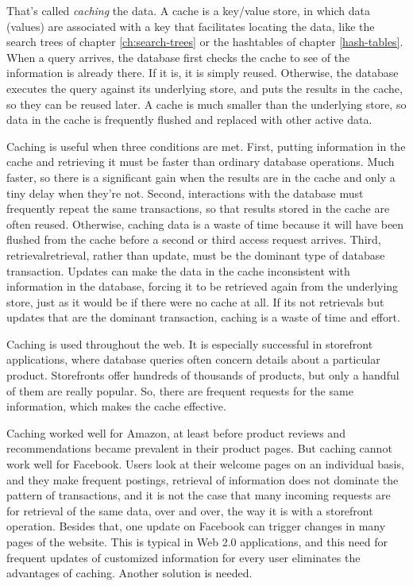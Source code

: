 That's called \emph{caching} the data.
A cache is a key/value store,
in which data (values) are associated with a key
that facilitates locating the data,
like the search trees of chapter \ref{ch:search-trees}
or the hashtables of chapter \ref{hash-tables}.
When a query arrives, the database first checks
the cache to see of the information is already there.
If it is, it is simply reused.
Otherwise, the database executes the query against its underlying store,
and puts the results in the cache, so they can be reused later.
A cache is much smaller than the underlying store,
so data in the cache is frequently flushed and replaced with other active data.

Caching is useful when three conditions are met.
First, putting information in the cache and retrieving it
must be faster than ordinary database operations.
Much faster, so there is a significant gain
when the results are in the cache and only a tiny delay when they're not.
Second, interactions with the database must frequently repeat the same transactions,
so that results stored in the cache are often reused.
Otherwise, caching data is a waste of time because it will
have been flushed from the cache before a second or third access request arrives.
Third, retrievalretrieval,
rather than update, must be the dominant type of database transaction.
Updates can make the data in the cache inconsistent with information in the database,
forcing it to be retrieved again from the underlying store,
just as it would be if there were no cache at all.
If its not retrievals but updates that are the dominant transaction,
caching is a waste of time and effort.

Caching is used throughout the web.
It is especially successful in storefront applications,
where database queries often concern details about a particular product.
Storefronts offer hundreds of thousands of products,
but only a handful of them are really popular.
So, there are frequent requests for the same information,
which makes the cache effective.

Caching worked well for Amazon, at least before product reviews
and recommendations became prevalent in their product pages.
But caching cannot work well for Facebook.
Users look at their welcome pages on an individual basis,
and they make frequent postings, retrieval of information
does not dominate the pattern of transactions,
and it is not the case that many incoming requests
are for retrieval of the same data, over and over,
the way it is with a storefront operation.
Besides that, one update on Facebook can trigger changes in many pages of the website.
This is typical in Web 2.0 applications,
and this need for frequent updates of customized information
for every user eliminates the advantages of caching.
Another solution is needed.

